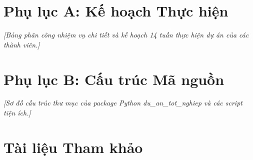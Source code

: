 \documentclass[12pt, a4paper]{report}
\begin{document}
\pagestyle{main}

\chapter*{Phụ lục A: Kế hoạch Thực hiện}
\label{app:kehoach}
\textit{[Bảng phân công nhiệm vụ chi tiết và kế hoạch 14 tuần thực hiện dự án của các thành viên.]}


\chapter*{Phụ lục B: Cấu trúc Mã nguồn}
\label{app:code}
\textit{[Sơ đồ cấu trúc thư mục của package Python du\_an\_tot\_nghiep và các script tiện ích.]}


\chapter*{Tài liệu Tham khảo}
\label{chap:thamkhao}
\end{document}
